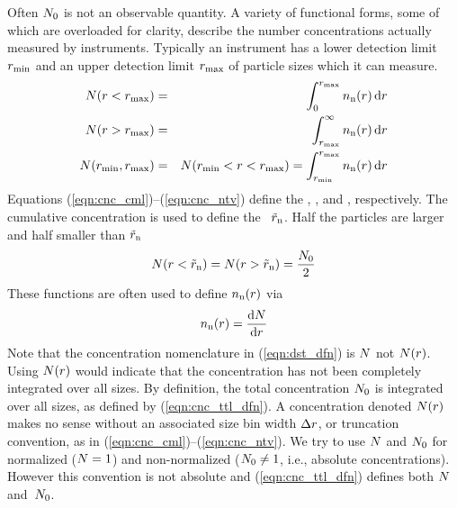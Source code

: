 \documentclass[12pt,twoside]{article}
\begin{document}
Often $N_{0}$ is not an observable quantity.
A variety of functional forms, some of which are overloaded for
clarity, describe the number concentrations actually measured by
instruments. 
Typically an instrument has a lower detection limit $r_\mathrm{min}$ and an
upper detection limit $r_\mathrm{max}$ of particle sizes which it can
measure.  
\begin{eqnarray}
N(r < r_\mathrm{max}) & = & \int_{0}^{r_\mathrm{max}} n_{\mathrm{n}}(r) \,\mathrm{d}r
\label{eqn:cnc_cml} \\ 
N(r > r_\mathrm{max}) & = & \int_{r_\mathrm{max}}^{\infty} n_{\mathrm{n}}(r) \,\mathrm{d}r
\label{eqn:cnc_gt} \\ 
N(r_\mathrm{min}, r_\mathrm{max}) & = & N(r_\mathrm{min} < r < r_\mathrm{max}) = \int_{r_\mathrm{min}}^{r_\mathrm{max}} n_{\mathrm{n}}(r) \,\mathrm{d}r
\label{eqn:cnc_ntv}
\end{eqnarray}
Equations (\ref{eqn:cnc_cml})--(\ref{eqn:cnc_ntv}) define the
, ,
and , respectively.
The cumulative concentration is used to define the 
~$\tilde{r}_{\mathrm{n}}$.
Half the particles are larger and half smaller than $\tilde{r}_{\mathrm{n}}$
\begin{equation}
N(r < \tilde{r}_{\mathrm{n}}) = N(r > \tilde{r}_{\mathrm{n}}) = \frac{N_{0}}{2}
\label{eqn:mdn_dfn}
\end{equation}
These functions are often used to define $n_{\mathrm{n}}(r)$ via 
\begin{equation}
n_{\mathrm{n}}(r) = \frac{\mathrm{d}N}{\mathrm{d}r}
\label{eqn:dst_dfn}
\end{equation}
Note that the concentration nomenclature in (\ref{eqn:dst_dfn}) is
$N$ not $N(r)$.
Using $N(r)$ would indicate that the concentration has not been
completely integrated over all sizes. 
By definition, the total concentration $N_{0}$ is integrated over
all sizes, as defined by (\ref{eqn:cnc_ttl_dfn}).
A concentration denoted $N(r)$ makes no sense without an
associated size bin width $\Delta r$, or truncation convention,
as in (\ref{eqn:cnc_cml})--(\ref{eqn:cnc_ntv}).
We try to use $N$ and $N_{0}$ for normalized ($N = 1$) and
non-normalized ($N_{0} \ne 1$, i.e., absolute concentrations).
However this convention is not absolute and (\ref{eqn:cnc_ttl_dfn})
defines both $N$ and~$N_{0}$.
\end{document}
